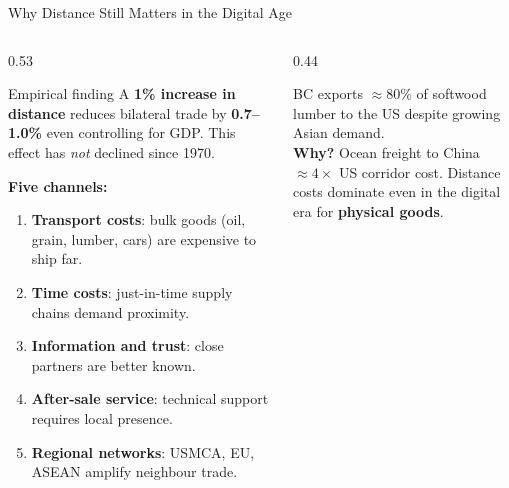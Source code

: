\documentclass[aspectratio=169]{beamer}
\begin{document}
\begin{frame}[shrink=7]{Why Distance Still Matters in the Digital Age}
\begin{columns}[T]
\begin{column}{0.53\textwidth}
\begin{alertblock}{Empirical finding}
\small A \textbf{1\% increase in distance} reduces bilateral trade by \textbf{0.7--1.0\%} even controlling for GDP. This effect has \emph{not} declined since 1970.
\end{alertblock}
\vspace{0.2em}
\textbf{Five channels:}
\begin{enumerate}\small
  \item \textbf{Transport costs}: bulk goods (oil, grain, lumber, cars) are expensive to ship far.
  \item \textbf{Time costs}: just-in-time supply chains demand proximity.
  \item \textbf{Information and trust}: close partners are better known.
  \item \textbf{After-sale service}: technical support requires local presence.
  \item \textbf{Regional networks}: USMCA, EU, ASEAN amplify neighbour trade.
\end{enumerate}
\end{column}
\begin{column}{0.44\textwidth}
\begin{canadex}
\footnotesize BC exports $\approx$80\% of softwood lumber to the US despite growing Asian demand.\\[0.2em]
\textbf{Why?} Ocean freight to China $\approx4\times$ US corridor cost. Distance costs dominate even in the digital era for \textbf{physical goods}.
\end{canadex}

\end{column}
\end{columns}
\end{frame}
\end{document}
